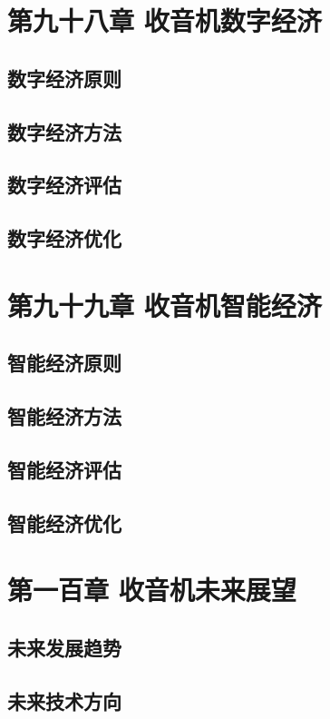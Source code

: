\documentclass[12pt,UTF8]{ctexbook}
\begin{document}
\chapter{第九十八章 收音机数字经济}

\section{数字经济原则}
\section{数字经济方法}
\section{数字经济评估}
\section{数字经济优化}

\chapter{第九十九章 收音机智能经济}

\section{智能经济原则}
\section{智能经济方法}
\section{智能经济评估}
\section{智能经济优化}

\chapter{第一百章 收音机未来展望}

\section{未来发展趋势}
\section{未来技术方向}
\end{document}
